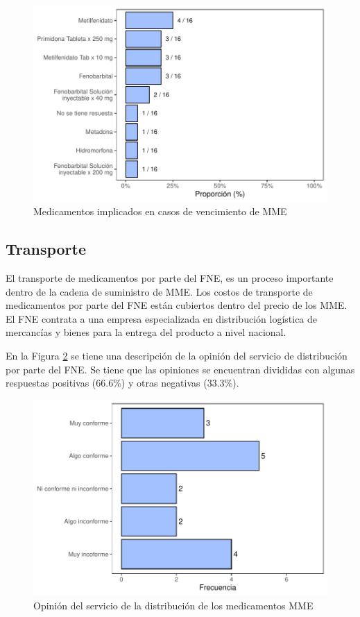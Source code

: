 \documentclass[
]{book}
\begin{document}
\begin{figure}
\includegraphics[width=0.85\linewidth]{InformeFinal_files/figure-latex/CasosVencimiento2-1} \caption{Medicamentos implicados en casos de vencimiento de MME}\label{fig:CasosVencimiento2}
\end{figure}

\hypertarget{transporte}{%
\subsection{Transporte}\label{transporte}}

El transporte de medicamentos por parte del FNE, es un proceso importante dentro de la cadena de suministro de MME. Los costos de transporte de medicamentos por parte del FNE están cubiertos dentro del precio de los MME. El FNE contrata a una empresa especializada en distribución logística de mercancías y bienes para la entrega del producto a nivel nacional.

En la Figura \ref{fig:TransporteProductos} se tiene una descripción de la opinión del servicio de distribución por parte del FNE. Se tiene que las opiniones se encuentran divididas con algunas respuestas positivas (66.6\%) y otras negativas (33.3\%).

\begin{figure}
\includegraphics[width=0.85\linewidth]{InformeFinal_files/figure-latex/TransporteProductos-1} \caption{Opinión del servicio de la distribución de los medicamentos MME}\label{fig:TransporteProductos}
\end{figure}
\end{document}

